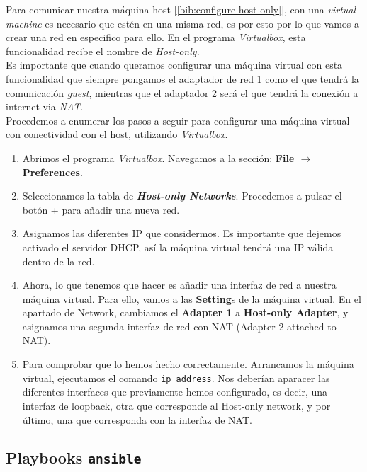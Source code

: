 \documentclass[12pt]{article}
\begin{document}
	\noindent Para comunicar nuestra máquina host [\ref{bib:configure host-only}], con una \textit{virtual machine} es necesario que estén en una misma red, es por esto por lo que vamos a crear una red en especifico para ello. En el programa \textit{Virtualbox}, esta funcionalidad recibe el nombre de \textit{Host-only}.\\
	
	\noindent Es importante que cuando queramos configurar una máquina virtual con esta funcionalidad que siempre pongamos el adaptador de red 1 como el que tendrá la comunicación \textit{guest}, mientras que el adaptador 2 será el que tendrá la conexión a internet via \textit{NAT}.\\
	
	\noindent Procedemos a enumerar los pasos a seguir para configurar una máquina virtual con conectividad con el host, utilizando \textit{Virtualbox}.
	
	\begin{enumerate}
		\item Abrimos el programa \textit{Virtualbox}. Navegamos a la sección: \textbf{File $\rightarrow$ Preferences}.
		\item Seleccionamos la tabla de \textbf{\textit{Host-only Networks}}. Procedemos a pulsar el botón + para añadir una nueva red.
		\item Asignamos las diferentes IP que considermos. Es importante que dejemos activado el servidor DHCP, así la máquina virtual tendrá una IP válida dentro de la red.
		\item Ahora, lo que tenemos que hacer es añadir una interfaz de red a nuestra máquina virtual. Para ello, vamos a las \textbf{Setting}s de la máquina virtual. En el apartado de Network, cambiamos el \textbf{Adapter 1} a\textbf{ Host-only Adapter}, y asignamos una segunda interfaz de red con NAT (Adapter 2 attached to NAT).
		\item Para comprobar que lo hemos hecho correctamente. Arrancamos la máquina virtual, ejecutamos el comando \texttt{ip address}. Nos deberían aparacer las diferentes interfaces que previamente hemos configurado, es decir, una interfaz de loopback, otra que corresponde al Host-only network, y por último, una que corresponda con la interfaz de NAT.
	\end{enumerate}
	
	\pagebreak
	
	\subsection{Playbooks \texttt{ansible}}
	
\end{document}
